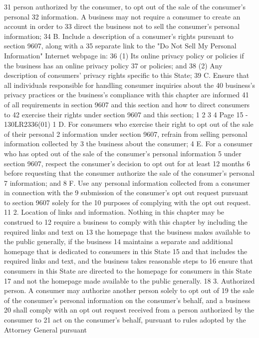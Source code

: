31 person authorized by the consumer, to opt out of the sale of the consumer's personal
32 information. A business may not require a consumer to create an account in order to
33 direct the business not to sell the consumer's personal information;
34 B. Include a description of a consumer's rights pursuant to section 9607, along with a
35 separate link to the "Do Not Sell My Personal Information" Internet webpage in:
36 (1) Its online privacy policy or policies if the business has an online privacy policy
37 or policies; and
38 (2) Any description of consumers' privacy rights specific to this State;
39 C. Ensure that all individuals responsible for handling consumer inquiries about the
40 business's privacy practices or the business's compliance with this chapter are informed
41 of all requirements in section 9607 and this section and how to direct consumers to
42 exercise their rights under section 9607 and this section;
1
2
3
4
Page 15 - 130LR2336(01)
1 D. For consumers who exercise their right to opt out of the sale of their personal
2 information under section 9607, refrain from selling personal information collected by
3 the business about the consumer;
4 E. For a consumer who has opted out of the sale of the consumer's personal information
5 under section 9607, respect the consumer's decision to opt out for at least 12 months
6 before requesting that the consumer authorize the sale of the consumer's personal
7 information; and
8 F. Use any personal information collected from a consumer in connection with the
9 submission of the consumer's opt out request pursuant to section 9607 solely for the
10 purposes of complying with the opt out request.
11 2. Location of links and information. Nothing in this chapter may be construed to
12 require a business to comply with this chapter by including the required links and text on
13 the homepage that the business makes available to the public generally, if the business
14 maintains a separate and additional homepage that is dedicated to consumers in this State
15 and that includes the required links and text, and the business takes reasonable steps to
16 ensure that consumers in this State are directed to the homepage for consumers in this State
17 and not the homepage made available to the public generally.
18 3. Authorized person. A consumer may authorize another person solely to opt out of
19 the sale of the consumer's personal information on the consumer's behalf, and a business
20 shall comply with an opt out request received from a person authorized by the consumer to
21 act on the consumer's behalf, pursuant to rules adopted by the Attorney General pursuant
